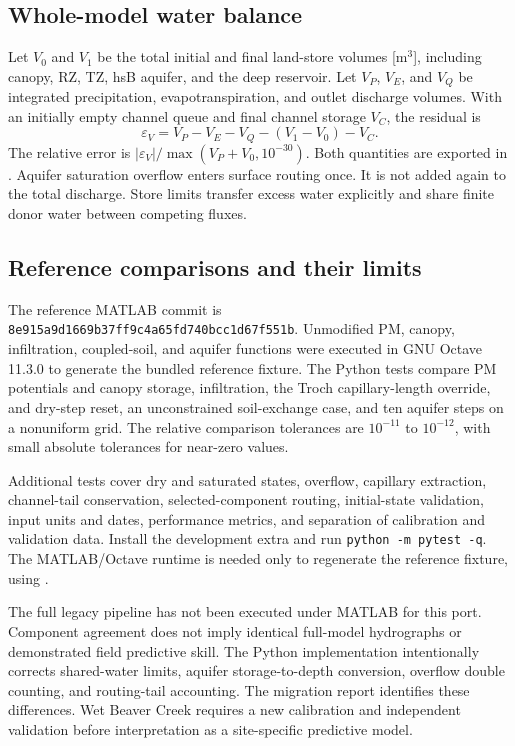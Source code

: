\subsection{Whole-model water balance}

Let $V_0$ and $V_1$ be the total initial and final land-store volumes [m$^3$], including canopy, RZ, TZ, hsB aquifer, and the deep reservoir. Let $V_P$, $V_E$, and $V_Q$ be integrated precipitation, evapotranspiration, and outlet discharge volumes. With an initially empty channel queue and final channel storage $V_C$, the residual is
\begin{equation}
\varepsilon_V=V_P-V_E-V_Q-(V_1-V_0)-V_C.
\end{equation}
The relative error is $|\varepsilon_V|/\max(V_P+V_0,10^{-30})$. Both quantities are exported in . Aquifer saturation overflow enters surface routing once. It is not added again to the total discharge. Store limits transfer excess water explicitly and share finite donor water between competing fluxes.

\subsection{Reference comparisons and their limits}

The reference MATLAB commit is \texttt{8e915a9d1669b37ff9c4a65fd740bcc1d67f551b}. Unmodified PM, canopy, infiltration, coupled-soil, and aquifer functions were executed in GNU Octave 11.3.0 to generate the bundled reference fixture. The Python tests compare PM potentials and canopy storage, infiltration, the Troch capillary-length override, and dry-step reset, an unconstrained soil-exchange case, and ten aquifer steps on a nonuniform grid. The relative comparison tolerances are $10^{-11}$ to $10^{-12}$, with small absolute tolerances for near-zero values.

Additional tests cover dry and saturated states, overflow, capillary extraction, channel-tail conservation, selected-component routing, initial-state validation, input units and dates, performance metrics, and separation of calibration and validation data. Install the development extra and run \texttt{python -m pytest -q}. The MATLAB/Octave runtime is needed only to regenerate the reference fixture, using .

The full legacy pipeline has not been executed under MATLAB for this port. Component agreement does not imply identical full-model hydrographs or demonstrated field predictive skill. The Python implementation intentionally corrects shared-water limits, aquifer storage-to-depth conversion, overflow double counting, and routing-tail accounting. The migration report identifies these differences. Wet Beaver Creek requires a new calibration and independent validation before interpretation as a site-specific predictive model.

